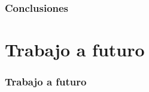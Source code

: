 \documentclass{beamer}
\begin{document}
\begin{frame}
\frametitle{Conclusiones} 

\end{frame}

\section{Trabajo a futuro} 

\begin{frame}
\frametitle{Trabajo a futuro} 

\end{frame}

\end{document}
